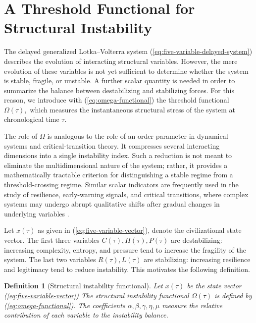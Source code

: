 \documentclass[11pt]{article}
\newcommand{\citep}{\cite}
\newtheorem{definition}{Definition}
\def\eq#1{(\ref{#1})}
\begin{document}


\section{A Threshold Functional for Structural Instability}
\label{sec:threshold-functional}

The delayed generalized Lotka--Volterra system \eq{eq:five-variable-delayed-system}  describes the evolution of interacting structural variables. However, the mere evolution of these variables is not yet sufficient to determine whether the system is stable, fragile, or unstable. A further scalar quantity   is needed in order to summarize the balance between destabilizing and stabilizing forces. For this reason, we introduce with \eq{eq:omega-functional} the  threshold functional 
$
\Omega(\tau),
$
which measures the instantaneous structural stress of the system at chronological time $\tau$.

The role of $\Omega$ is analogous to the role of an order parameter in dynamical systems and critical-transition theory. It compresses several interacting dimensions into a single instability index. Such a reduction is not meant to eliminate the multidimensional nature of the system; rather, it provides a mathematically tractable criterion for distinguishing a stable regime from a threshold-crossing regime. Similar scalar indicators are frequently used in the study of resilience, early-warning signals, and critical transitions, where complex systems may undergo abrupt qualitative shifts after gradual changes in underlying variables \citep{lenton2019climate,dakos2024tipping,george2023early,xu2023nonequilibrium}.

Let
$
x(\tau)
$ as given in \eq{eq:five-variable-vector},
denote the civilizational state vector. 
The first three variables $C(\tau) , H(\tau) , P(\tau)  $ are destabilizing: increasing complexity, entropy, and pressure tend to increase the fragility of the system. The last two variables $R(\tau), L(\tau)$ are stabilizing: increasing resilience and legitimacy tend to reduce instability. This motivates the following definition.



\begin{definition}[Structural instability functional]
	\label{def:omega}
	Let
	$
	x(\tau)
	$ be the state vector  \eq{eq:five-variable-vector}
	The structural instability functional $\Omega(\tau)$ is defined by
 \eq{eq:omega-functional}.
	The coefficients $\alpha,\beta,\gamma,\eta,\mu$ measure the relative contribution of each variable to the instability balance.
\end{definition}
\end{document}
